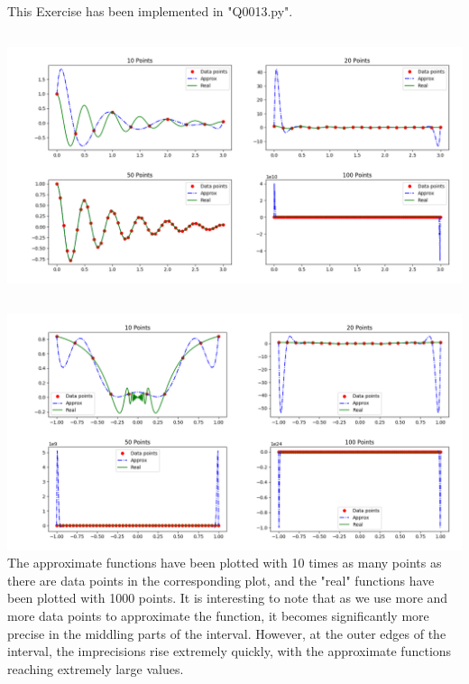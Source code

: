 This Exercise has been implemented in "Q0013.py".
\subsection{}
\subsection{}
\includegraphics[width=\linewidth]{plots}
\subsection{}
\includegraphics[width=\linewidth]{plots1}
The approximate functions have been plotted with 10 times as many points as there are data points in the corresponding plot, and the "real" functions have been plotted with 1000 points. It is interesting to note that as we use more and more data points to approximate the function, it becomes significantly more precise in the middling parts of the interval. However, at the outer edges of the interval, the imprecisions rise extremely quickly, with the approximate functions reaching extremely large values.

